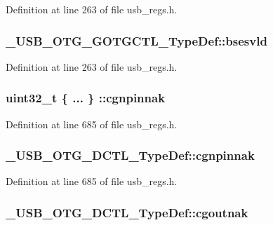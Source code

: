 Definition at line 263 of file usb\-\_\-regs.\-h.

\hypertarget{group___u_s_b___o_t_g___d_r_i_v_e_r_gaf855a8f6b69e3065e44e148d71cad9d9}{
\subsubsection[{bsesvld}]{ \-\_\-\-U\-S\-B\-\_\-\-O\-T\-G\-\_\-\-G\-O\-T\-G\-C\-T\-L\-\_\-\-Type\-Def\-::bsesvld}}\label{group___u_s_b___o_t_g___d_r_i_v_e_r_gaf855a8f6b69e3065e44e148d71cad9d9}


Definition at line 263 of file usb\-\_\-regs.\-h.

\hypertarget{group___u_s_b___o_t_g___d_r_i_v_e_r_gaaa9c515bf1d3b8a6ce96137b482306cc}{
\subsubsection[{cgnpinnak}]{\setlength{\rightskip}{0pt plus 5cm}uint32\-\_\-t \{ ... \} \-::cgnpinnak}}\label{group___u_s_b___o_t_g___d_r_i_v_e_r_gaaa9c515bf1d3b8a6ce96137b482306cc}


Definition at line 685 of file usb\-\_\-regs.\-h.

\hypertarget{group___u_s_b___o_t_g___d_r_i_v_e_r_ga41d7827ced20eb92bcb20d8a1afc1fe9}{
\subsubsection[{cgnpinnak}]{ \-\_\-\-U\-S\-B\-\_\-\-O\-T\-G\-\_\-\-D\-C\-T\-L\-\_\-\-Type\-Def\-::cgnpinnak}}\label{group___u_s_b___o_t_g___d_r_i_v_e_r_ga41d7827ced20eb92bcb20d8a1afc1fe9}


Definition at line 685 of file usb\-\_\-regs.\-h.

\hypertarget{group___u_s_b___o_t_g___d_r_i_v_e_r_ga1b74633ad9483a5f99ade463d5461b23}{
\subsubsection[{cgoutnak}]{ \-\_\-\-U\-S\-B\-\_\-\-O\-T\-G\-\_\-\-D\-C\-T\-L\-\_\-\-Type\-Def\-::cgoutnak}}\label{group___u_s_b___o_t_g___d_r_i_v_e_r_ga1b74633ad9483a5f99ade463d5461b23}


